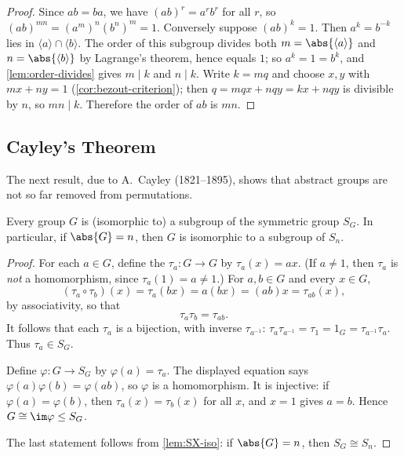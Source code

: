 \begin{proof}
	Since \(ab = ba\), we have \((ab)^r = a^rb^r\) for all \(r\), so
	\((ab)^{mn} = (a^m)^n(b^n)^m = 1\). Conversely suppose \((ab)^k = 1\). Then
	\(a^k = b^{-k}\) lies in \(\langle a\rangle \cap \langle b\rangle\). The order of
	this subgroup divides both \(m = \abs{\langle a\rangle}\) and
	\(n = \abs{\langle b\rangle}\) by Lagrange's theorem, hence equals \(1\); so
	\(a^k = 1 = b^k\), and \autoref{lem:order-divides} gives \(m \mid k\) and \(n \mid k\).
	Write \(k = mq\) and choose \(x, y\) with \(mx + ny = 1\)
	(\autoref{cor:bezout-criterion}); then \(q = mqx + nqy = kx + nqy\) is divisible by
	\(n\), so \(mn \mid k\). Therefore the order of \(ab\) is \(mn\).
\end{proof}

\subsection{Cayley's Theorem}

The next result, due to A.~Cayley (1821--1895), shows that abstract groups are not so far
removed from permutations.

\begin{theorem}[Cayley]\label{thm:cayley}
	Every group \(G\) is (isomorphic to) a subgroup of the symmetric group \(S_G\). In
	particular, if \(\abs{G} = n\), then \(G\) is isomorphic to a subgroup of \(S_n\).
\end{theorem}

\begin{proof}
	For each \(a \in G\), define the  \(\tau_a\colon G \to G\) by
	\(\tau_a(x) = ax\). (If \(a \neq 1\), then \(\tau_a\) is \emph{not} a homomorphism,
	since \(\tau_a(1) = a \neq 1\).) For \(a, b \in G\) and every \(x \in G\),
	\[
		(\tau_a \circ \tau_b)(x) = \tau_a(bx) = a(bx) = (ab)x = \tau_{ab}(x),
	\]
	by associativity, so that
	\[
		\tau_a\tau_b = \tau_{ab}.
	\]
	It follows that each \(\tau_a\) is a bijection, with inverse \(\tau_{a^{-1}}\):
	\(\tau_a\tau_{a^{-1}} = \tau_1 = 1_G = \tau_{a^{-1}}\tau_a\). Thus
	\(\tau_a \in S_G\).

	Define \(\varphi\colon G \to S_G\) by \(\varphi(a) = \tau_a\). The displayed equation
	says \(\varphi(a)\varphi(b) = \varphi(ab)\), so \(\varphi\) is a homomorphism. It is
	injective: if \(\varphi(a) = \varphi(b)\), then \(\tau_a(x) = \tau_b(x)\) for all
	\(x\), and \(x = 1\) gives \(a = b\). Hence \(G \cong \im\varphi \leq S_G\).

	The last statement follows from \autoref{lem:SX-iso}: if \(\abs{G} = n\), then
	\(S_G \cong S_n\).
\end{proof}

